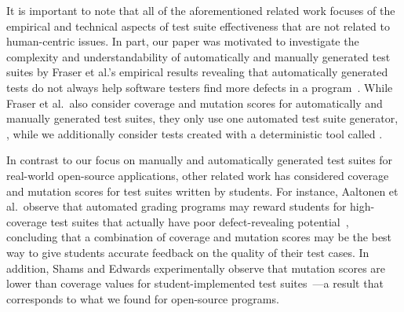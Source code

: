 
It is important to note that all of the aforementioned related work focuses of the empirical and technical aspects of test suite effectiveness that are not related to human-centric issues.  In part, our paper was motivated to investigate the complexity and understandability of automatically and manually generated test suites by Fraser et al.'s empirical results revealing that automatically generated tests do not always help software testers find more defects in a program~\cite{fraser2013c}.  While Fraser et al.\ also consider coverage and mutation scores for automatically and manually generated test suites, they only use one automated test suite generator, \evo, while we additionally consider tests created with a deterministic tool called \codepro.

In contrast to our focus on manually and automatically generated test suites for real-world open-source applications, other related work has considered coverage and mutation scores for test suites written by students. For instance, Aaltonen et al.\ observe that automated grading programs may reward students for high-coverage test suites that actually have poor defect-revealing potential~\cite{aaltonen:2010:mav:1869542.1869567}, concluding that a combination of coverage and mutation scores may be the best way to give students accurate feedback on the quality of their test cases.  In addition, Shams and Edwards experimentally observe that mutation scores are lower than coverage values for student-implemented test suites~\cite{shams2013}---a result that corresponds to what we found for open-source programs.

